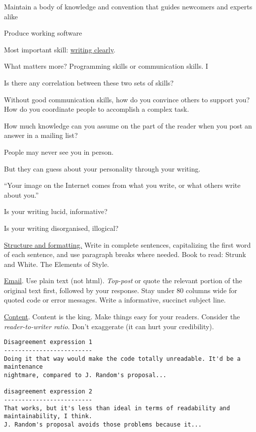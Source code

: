 \documentclass[landscape,30pt]{foils}
\begin{document}
Maintain a body of knowledge and convention that guides newcomers and experts alike

Produce working software


Most important skill: \underline{writing clearly}.

What matters more? Programming skills or communication skills.  I

Is there any correlation between these two sets of skills?

Without good communication skills, how do you convince others to support you?  How do you coordinate people to accomplish a complex task.

How much knowledge can you assume on the part of the reader when you post an answer in a mailing list?


People may never see you in person.

But they can guess about your personality through your writing.

``Your image on the Internet comes from what you write, or what others write about you.''

Is your writing lucid, informative?

Is your writing disorganised, illogical?

\underline{Structure and formatting.}   Write in complete sentences, capitalizing the first word of each sentence, and use paragraph breaks where needed.  Book to read: Strunk and White.  The Elements of Style.

\underline{Email}.  Use plain text (not html).  {\em Top-post} or quote the relevant portion of the original text first, followed by your response.  Stay under 80 columns wide for quoted code or error messages.  Write a informative, succinct subject line.

\underline{Content}.  Content is the king.  Make things easy for your readers. Consider the {\em reader-to-writer ratio}. Don't exaggerate (it can hurt your credibility).

{\tiny
\begin{verbatim}
Disagreement expression 1
-------------------------
Doing it that way would make the code totally unreadable. It'd be a maintenance
nightmare, compared to J. Random's proposal...

disagreement expression 2
-------------------------
That works, but it's less than ideal in terms of readability and maintainability, I think.
J. Random's proposal avoids those problems because it...
\end{verbatim}
}
\end{document}

